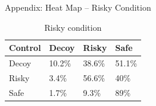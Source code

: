 \documentclass[
  ignorenonframetext,
  aspectratio=169]{beamer}
\begin{document}
\begin{frame}{Appendix: Heat Map -- Risky Condition}
\label{appendix-heat-map-risky-condition}
\begin{table}
\centering
\caption{\label{tab:unnamed-chunk-14}Risky condition}
\centering
\begin{tabular}[t]{llll}
\toprule
Control & Decoy & Risky & Safe\\
\midrule
Decoy & 10.2\% & 38.6\% & 51.1\%\\
Risky & 3.4\% & 56.6\% & 40\%\\
Safe & 1.7\% & 9.3\% & 89\%\\
\bottomrule
\end{tabular}
\end{table}
\end{frame}
\end{document}
